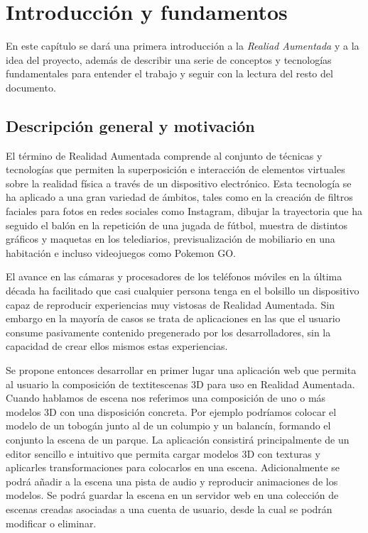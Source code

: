 \chapter{Introducción y fundamentos}


En este capítulo se dará una primera introducción a la \textit{Realiad Aumentada} y a la idea del proyecto, además de describir una serie de conceptos y tecnologías fundamentales para entender el trabajo y seguir con la lectura del resto del documento.


\section{Descripción general y motivación}

El término de Realidad Aumentada comprende al conjunto de técnicas y tecnologías que permiten la superposición e interacción de elementos virtuales sobre la realidad física a través de un dispositivo electrónico. Esta tecnología se ha aplicado a una gran variedad de ámbitos, tales como en la creación de filtros faciales para fotos en redes sociales como Instagram, dibujar la trayectoria que ha seguido el balón en la repetición de una jugada de fútbol, muestra de distintos gráficos y maquetas en los telediarios, previsualización de mobiliario en una habitación e incluso videojuegos como Pokemon GO.

El avance en las cámaras y procesadores de los teléfonos móviles en la última década ha facilitado que casi cualquier persona tenga en el bolsillo un dispositivo capaz de reproducir experiencias muy vistosas de Realidad Aumentada. Sin embargo en la mayoría de casos se trata de aplicaciones en las que el usuario consume pasivamente contenido pregenerado por los desarrolladores, sin la capacidad de crear ellos mismos estas experiencias.

Se propone entonces desarrollar en primer lugar una aplicación web que permita al usuario la composición de textit{escenas 3D} para uso en Realidad Aumentada. Cuando hablamos de escena nos referimos una composición de uno o más modelos 3D con una disposición concreta. Por ejemplo podríamos colocar el modelo de un tobogán junto al de un columpio y un balancín, formando el conjunto la escena de un parque. La aplicación consistirá principalmente de un editor sencillo e intuitivo que permita cargar modelos 3D con texturas y aplicarles transformaciones para colocarlos en una escena. Adicionalmente se podrá añadir a la escena una pista de audio y reproducir animaciones de los modelos. Se podrá guardar la escena en un servidor web en una colección de escenas creadas asociadas a una cuenta de usuario, desde la cual se podrán modificar o eliminar.

